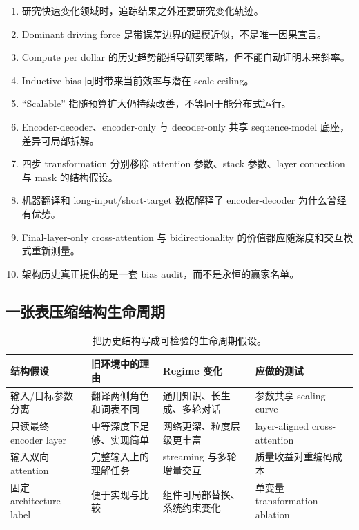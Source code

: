 \documentclass[a4paper]{article}
\begin{document}
\begin{enumerate}
  \item 研究快速变化领域时，追踪结果之外还要研究变化轨迹。
  \item Dominant driving force 是带误差边界的建模近似，不是唯一因果宣言。
  \item Compute per dollar 的历史趋势能指导研究策略，但不能自动证明未来斜率。
  \item Inductive bias 同时带来当前效率与潜在 scale ceiling。
  \item ``Scalable'' 指随预算扩大仍持续改善，不等同于能分布式运行。
  \item Encoder-decoder、encoder-only 与 decoder-only 共享 sequence-model 底座，差异可局部拆解。
  \item 四步 transformation 分别移除 attention 参数、stack 参数、layer connection 与 mask 的结构假设。
  \item 机器翻译和 long-input/short-target 数据解释了 encoder-decoder 为什么曾经有优势。
  \item Final-layer-only cross-attention 与 bidirectionality 的价值都应随深度和交互模式重新测量。
  \item 架构历史真正提供的是一套 bias audit，而不是永恒的赢家名单。
\end{enumerate}

\subsection{一张表压缩结构生命周期}

\begin{table}[H]
\centering
\small
\begin{tabular}{@{}L{0.17\textwidth}L{0.24\textwidth}L{0.24\textwidth}L{0.25\textwidth}@{}}
\toprule
结构假设 & 旧环境中的理由 & Regime 变化 & 应做的测试 \\
\midrule
输入/目标参数分离 & 翻译两侧角色和词表不同 & 通用知识、长生成、多轮对话 & 参数共享 scaling curve \\
只读最终 encoder layer & 中等深度下足够、实现简单 & 网络更深、粒度层级更丰富 & layer-aligned cross-attention \\
输入双向 attention & 完整输入上的理解任务 & streaming 与多轮增量交互 & 质量收益对重编码成本 \\
固定 architecture label & 便于实现与比较 & 组件可局部替换、系统约束变化 & 单变量 transformation ablation \\
\bottomrule
\end{tabular}
\caption{把历史结构写成可检验的生命周期假设。}
\end{table}
\end{document}
